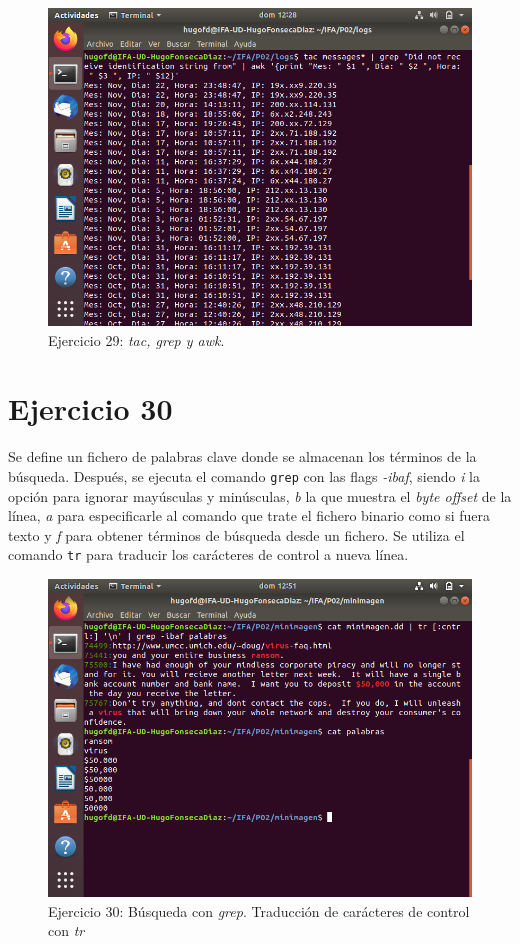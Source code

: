\documentclass[11pt]{article}
\begin{document}
\begin{figure}[H]
    \caption{Ejercicio 29: \textit{tac, grep y awk}.}
  \centering
  \includegraphics[scale=0.7]{e29.png}
\end{figure}

\section{Ejercicio 30}
Se define un fichero de palabras clave donde se almacenan los términos de la búsqueda. Después, se ejecuta el comando \verb|grep| con las flags \textit{-ibaf}, siendo \textit{i} la opción para ignorar mayúsculas y minúsculas, \textit{b} la que muestra el \textit{byte offset} de la línea, \textit{a} para especificarle al comando que trate el fichero binario como si fuera texto y \textit{f} para obtener términos de búsqueda desde un fichero. Se utiliza el comando \verb|tr| para traducir los carácteres de control a nueva línea.

\begin{figure}[H]
    \caption{Ejercicio 30: Búsqueda con \textit{grep}. Traducción de carácteres de control con \textit{tr}}
  \centering
  \includegraphics[scale=0.7]{e30-1.png}
\end{figure}
\end{document}
